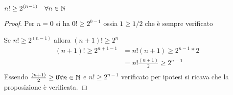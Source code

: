 \begin{thm}
    $\displaystyle n! \geq 2^{(n-1)} \quad \forall n \in \mathbb{N}$
\end{thm}
\begin{proof}
Per $n = 0$ si ha $0! \geq 2^{0-1}$ ossia $ 1 \geq 1/2$ che è sempre verificato

Se $n! \geq 2^{(n-1)}$ allora $(n+1)! \geq 2^n$
\begin{equation*}
\begin{split}
(n+1)! \geq 2^{n+1-1} & = n! (n+1) \geq 2^{n-1} * 2 \\
                      & = n! \frac{(n+1)}{2} \geq 2^{n-1} \\
\end{split}
\end{equation*}
Essendo $\frac{(n+1)}{2} \geq 0 \forall n \in \mathbb{N}$ e $n! \geq 2^{n-1}$ verificato per ipotesi
si ricava che la proposizione è verificata.
\end{proof}
